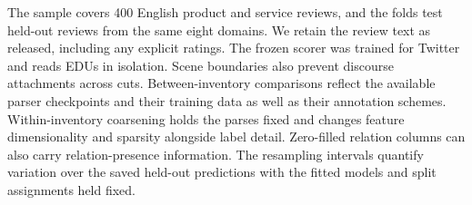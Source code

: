 The sample covers 400 English product and service reviews, and the folds
test held-out reviews from the same eight domains. We retain the review
text as released, including any explicit ratings. The frozen scorer was
trained for Twitter and reads EDUs in isolation. Scene boundaries also
prevent discourse attachments across cuts. Between-inventory comparisons
reflect the available parser checkpoints and their training data as well
as their annotation schemes. Within-inventory coarsening holds the parses
fixed and changes feature dimensionality and sparsity alongside label
detail. Zero-filled relation columns can also carry relation-presence
information. The resampling intervals quantify variation over the saved
held-out predictions with the fitted models and split assignments held
fixed.
